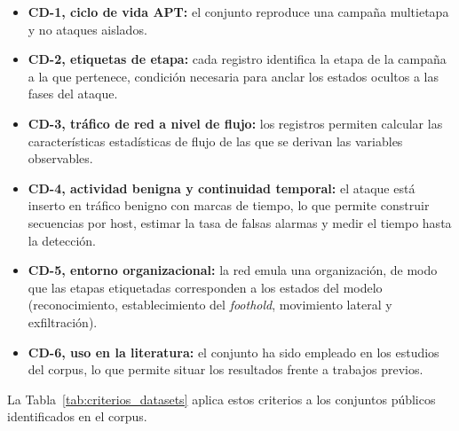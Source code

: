 \begin{itemize}
    \item \textbf{CD-1, ciclo de vida APT:} el conjunto reproduce una campaña multietapa y no ataques aislados.
    \item \textbf{CD-2, etiquetas de etapa:} cada registro identifica la etapa de la campaña a la que pertenece, condición necesaria para anclar los estados ocultos a las fases del ataque.
    \item \textbf{CD-3, tráfico de red a nivel de flujo:} los registros permiten calcular las características estadísticas de flujo de las que se derivan las variables observables.
    \item \textbf{CD-4, actividad benigna y continuidad temporal:} el ataque está inserto en tráfico benigno con marcas de tiempo, lo que permite construir secuencias por host, estimar la tasa de falsas alarmas y medir el tiempo hasta la detección.
    \item \textbf{CD-5, entorno organizacional:} la red emula una organización, de modo que las etapas etiquetadas corresponden a los estados del modelo (reconocimiento, establecimiento del \textit{foothold}, movimiento lateral y exfiltración).
    \item \textbf{CD-6, uso en la literatura:} el conjunto ha sido empleado en los estudios del corpus, lo que permite situar los resultados frente a trabajos previos.
\end{itemize}

La Tabla~\ref{tab:criterios_datasets} aplica estos criterios a los conjuntos públicos identificados en el corpus.

